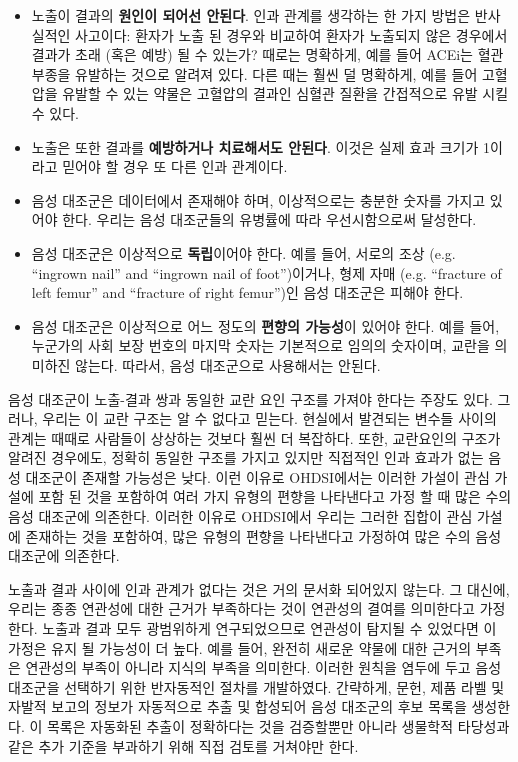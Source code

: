 \documentclass[11pt]{book}
\providecommand{\tightlist}{%
  \setlength{\itemsep}{0pt}\setlength{\parskip}{0pt}}
\theoremstyle{definition}
\theoremstyle{definition}
\theoremstyle{definition}
\theoremstyle{remark}
\begin{document}
\begin{itemize}
\tightlist
\item
  노출이 결과의 \textbf{원인이 되어선 안된다}. 인과 관계를 생각하는 한
  가지 방법은 반사실적인 사고이다: 환자가 노출 된 경우와 비교하여 환자가
  노출되지 않은 경우에서 결과가 초래 (혹은 예방) 될 수 있는가? 때로는
  명확하게, 예를 들어 ACEi는 혈관 부종을 유발하는 것으로 알려져 있다.
  다른 때는 훨씬 덜 명확하게, 예를 들어 고혈압을 유발할 수 있는 약물은
  고혈압의 결과인 심혈관 질환을 간접적으로 유발 시킬 수 있다.
\item
  노출은 또한 결과를 \textbf{예방하거나 치료해서도 안된다}. 이것은 실제
  효과 크기가 1이라고 믿어야 할 경우 또 다른 인과 관계이다.
\item
  음성 대조군은 데이터에서 존재해야 하며, 이상적으로는 충분한 숫자를
  가지고 있어야 한다. 우리는 음성 대조군들의 유병률에 따라
  우선시함으로써 달성한다.
\item
  음성 대조군은 이상적으로 \textbf{독립}이어야 한다. 예를 들어, 서로의
  조상 (e.g. ``ingrown nail'' and ``ingrown nail of foot'')이거나, 형제
  자매 (e.g. ``fracture of left femur'' and ``fracture of right
  femur'')인 음성 대조군은 피해야 한다.
\item
  음성 대조군은 이상적으로 어느 정도의 \textbf{편향의 가능성}이 있어야
  한다. 예를 들어, 누군가의 사회 보장 번호의 마지막 숫자는 기본적으로
  임의의 숫자이며, 교란을 의미하진 않는다. 따라서, 음성 대조군으로
  사용해서는 안된다.
\end{itemize}

음성 대조군이 노출-결과 쌍과 동일한 교란 요인 구조를 가져야 한다는
주장도 있다. \citep{lipsitch_2010}그러나, 우리는 이 교란 구조는 알 수
없다고 믿는다. 현실에서 발견되는 변수들 사이의 관계는 때때로 사람들이
상상하는 것보다 훨씬 더 복잡하다. 또한, 교란요인의 구조가 알려진
경우에도, 정확히 동일한 구조를 가지고 있지만 직접적인 인과 효과가 없는
음성 대조군이 존재할 가능성은 낮다. 이런 이유로 OHDSI에서는 이러한
가설이 관심 가설에 포함 된 것을 포함하여 여러 가지 유형의 편향을
나타낸다고 가정 할 때 많은 수의 음성 대조군에 의존한다. 이러한 이유로
OHDSI에서 우리는 그러한 집합이 관심 가설에 존재하는 것을 포함하여, 많은
유형의 편향을 나타낸다고 가정하여 많은 수의 음성 대조군에 의존한다.

노출과 결과 사이에 인과 관계가 없다는 것은 거의 문서화 되어있지 않는다.
그 대신에, 우리는 종종 연관성에 대한 근거가 부족하다는 것이 연관성의
결여를 의미한다고 가정한다. 노출과 결과 모두 광범위하게 연구되었으므로
연관성이 탐지될 수 있었다면 이 가정은 유지 될 가능성이 더 높다. 예를
들어, 완전히 새로운 약물에 대한 근거의 부족은 연관성의 부족이 아니라
지식의 부족을 의미한다. 이러한 원칙을 염두에 두고 음성 대조군을 선택하기
위한 반자동적인 절차를 개발하였다. \citep{voss_2016} 간략하게, 문헌,
제품 라벨 및 자발적 보고의 정보가 자동적으로 추출 및 합성되어 음성
대조군의 후보 목록을 생성한다. 이 목록은 자동화된 추출이 정확하다는 것을
검증할뿐만 아니라 생물학적 타당성과 같은 추가 기준을 부과하기 위해 직접
검토를 거쳐야만 한다.
\end{document}
